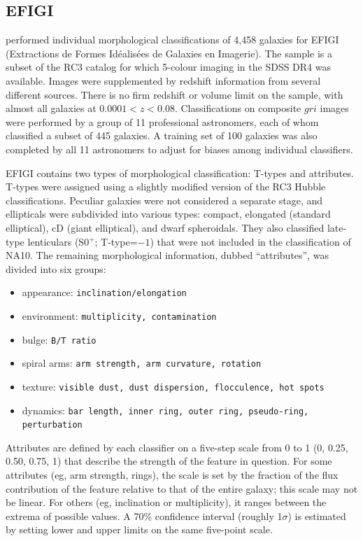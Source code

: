 \documentclass[useAMS,usenatbib]{mn2e}
\begin{document}
\subsection{EFIGI}

\citet{bai11} performed individual morphological classifications of 4,458 galaxies for EFIGI (Extractions de Formes Id\'ealis\'ees de Galaxies en Imagerie). The sample is a subset of the RC3 catalog for which 5-colour imaging in the SDSS DR4 was available. Images were supplemented by redshift information from several different sources. There is no firm redshift or volume limit on the sample, with almost all galaxies at $0.0001<z<0.08$. Classifications on composite $gri$ images were performed by a group of 11 professional astronomers, each of whom classified a subset of 445 galaxies. A training set of 100 galaxies was also completed by all 11 astronomers to adjust for biases among individual classifiers. 

EFIGI contains two types of morphological classification: T-types and attributes. T-types were assigned using a slightly modified version of the RC3 Hubble classifications. Peculiar galaxies were not considered a separate stage, and ellipticals were subdivided into various types: compact, elongated (standard elliptical), cD (giant elliptical), and dwarf spheroidals. They also classified late-type lenticulars (S0$^+$; T-type=$-1$) that were not included in the classification of NA10. The remaining morphological information, dubbed ``attributes'', was divided into six groups:

\begin{itemize}
	\item appearance: {\tt inclination/elongation }
	\item environment: {\tt multiplicity, contamination}
	\item bulge: {\tt B/T ratio}
	\item spiral arms: {\tt arm strength, arm curvature, rotation}
	\item texture: {\tt visible dust, dust dispersion, flocculence, hot spots}
	\item dynamics: {\tt bar length, inner ring, outer ring, pseudo-ring, perturbation}
\end{itemize}

\noindent Attributes are defined by each classifier on a five-step scale from 0 to 1 (0, 0.25, 0.50, 0.75, 1) that describe the strength of the feature in question. For some attributes (eg, arm strength, rings), the scale is set by the fraction of the flux contribution of the feature relative to that of the entire galaxy; this scale may not be linear. For others (eg, inclination or multiplicity), it ranges between the extrema of possible values. A 70\% confidence interval (roughly 1$\sigma$) is estimated by setting lower and upper limits on the same five-point scale.
\end{document}
